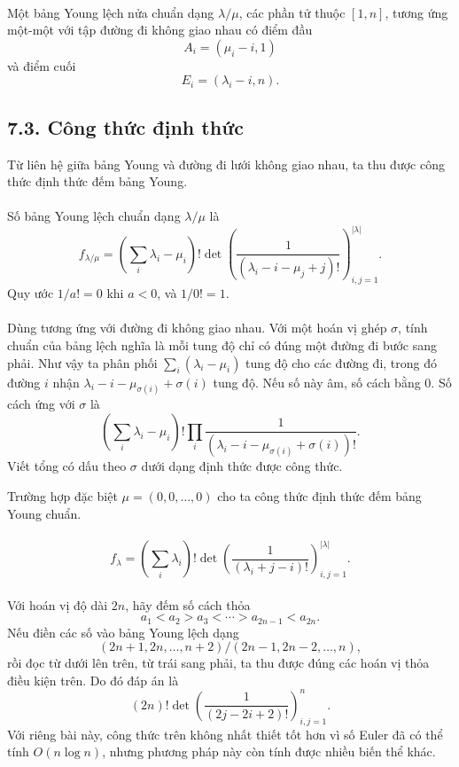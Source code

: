 \documentclass[11pt]{article}
\begin{document}
\paragraph{}
Một bảng Young lệch nửa chuẩn dạng \(\lambda/\mu\), các phần tử thuộc
\([1,n]\), tương ứng một-một với tập đường đi không giao nhau có điểm đầu
\[
A_i=(\mu_i-i,1)
\]
và điểm cuối
\[
E_i=(\lambda_i-i,n).
\]

\subsection*{7.3. Công thức định thức}

Từ liên hệ giữa bảng Young và đường đi lưới không giao nhau, ta thu được công
thức định thức đếm bảng Young.

\paragraph{}
Số bảng Young lệch chuẩn dạng \(\lambda/\mu\) là
\[
f_{\lambda/\mu}=
\left(\sum_i\lambda_i-\mu_i\right)!
\det\left(
\frac1{(\lambda_i-i-\mu_j+j)!}
\right)_{i,j=1}^{|\lambda|}.
\]
Quy ước \(1/a!=0\) khi \(a<0\), và \(1/0!=1\).

\paragraph{}
Dùng tương ứng với đường đi không giao nhau. Với một hoán vị ghép \(\sigma\),
tính chuẩn của bảng lệch nghĩa là mỗi tung độ chỉ có đúng một đường đi bước
sang phải. Như vậy ta phân phối \(\sum_i(\lambda_i-\mu_i)\) tung độ cho các
đường đi, trong đó đường \(i\) nhận
\(\lambda_i-i-\mu_{\sigma(i)}+\sigma(i)\) tung độ. Nếu số này âm, số cách bằng
\(0\). Số cách ứng với \(\sigma\) là
\[
\left(\sum_i\lambda_i-\mu_i\right)!
\prod_i \frac1{(\lambda_i-i-\mu_{\sigma(i)}+\sigma(i))!}.
\]
Viết tổng có dấu theo \(\sigma\) dưới dạng định thức được công thức.

Trường hợp đặc biệt \(\mu=(0,0,\ldots,0)\) cho ta công thức định thức đếm
bảng Young chuẩn.

\paragraph{}
\[
f_\lambda=
\left(\sum_i\lambda_i\right)!
\det\left(\frac1{(\lambda_i+j-i)!}\right)_{i,j=1}^{|\lambda|}.
\]

\paragraph{}
Với hoán vị độ dài \(2n\), hãy đếm số cách thỏa
\[
a_1<a_2>a_3<\cdots>a_{2n-1}<a_{2n}.
\]
Nếu điền các số vào bảng Young lệch dạng
\[
(2n+1,2n,\ldots,n+2)/(2n-1,2n-2,\ldots,n),
\]
rồi đọc từ dưới lên trên, từ trái sang phải, ta thu được đúng các hoán vị
thỏa điều kiện trên. Do đó đáp án là
\[
(2n)!\det\left(\frac1{(2j-2i+2)!}\right)_{i,j=1}^n.
\]
Với riêng bài này, công thức trên không nhất thiết tốt hơn vì số Euler đã có
thể tính \(O(n\log n)\), nhưng phương pháp này còn tính được nhiều biến thể
khác.
\end{document}
